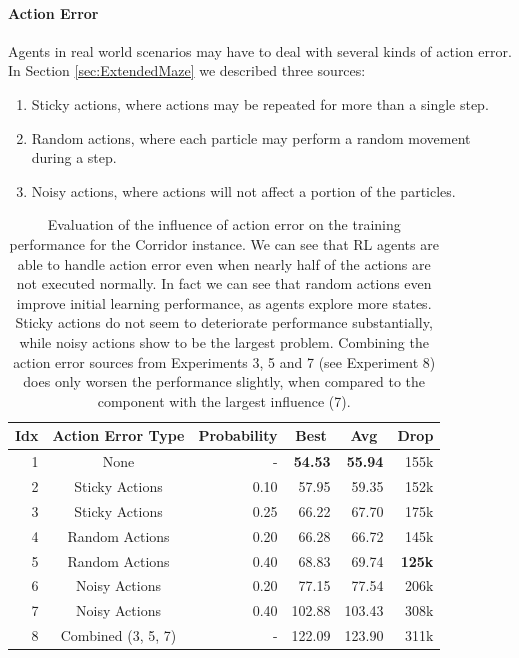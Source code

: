 \paragraph{Action Error}
Agents in real world scenarios may have to deal with several kinds of action error. In Section \ref{sec:ExtendedMaze} we described three sources: 
\begin{enumerate}
    \item Sticky actions, where actions may be repeated for more than a single step.
    \item Random actions, where each particle may perform a random movement during a step.
    \item Noisy actions, where actions will not affect a portion of the particles.
\end{enumerate}

\begin{table}[htp]
    \begin{center}
        \begin{tabular}{rcrrrr}
            \toprule
            \multicolumn{1}{c}{Idx} & \multicolumn{1}{c}{Action Error Type} & \multicolumn{1}{c}{Probability} & \multicolumn{1}{c}{Best} & \multicolumn{1}{c}{Avg} & \multicolumn{1}{c}{Drop}\\
            \midrule
            1 & None & - & \textbf{54.53} & \textbf{55.94} & 155k \\
            \midrule
            2 & Sticky Actions & 0.10 & 57.95 & 59.35 & 152k \\
            3 & Sticky Actions & 0.25 & 66.22 & 67.70 & 175k \\
            4 & Random Actions & 0.20 & 66.28 & 66.72 & 145k \\
            5 & Random Actions & 0.40 & 68.83 & 69.74 & \textbf{125k} \\
            6 & Noisy Actions & 0.20 & 77.15 & 77.54 & 206k \\
            7 & Noisy Actions & 0.40 & 102.88 & 103.43 & 308k \\
            \midrule
            8 & Combined (3, 5, 7) & - & 122.09 & 123.90 & 311k \\
            \bottomrule
        \end{tabular}
    \end{center}
    \caption[Evaluation of the Influence of Action Error]{Evaluation of the influence of action error on the training performance for the Corridor instance. We can see that RL agents are able to handle action error even when nearly half of the actions are not executed normally. In fact we can see that random actions even improve initial learning performance, as agents explore more states. Sticky actions do not seem to deteriorate performance substantially, while noisy actions show to be the largest problem. Combining the action error sources from Experiments 3, 5 and 7 (see Experiment 8) does only worsen the performance slightly, when compared to the component with the largest influence (7).} \label{tab:Eval/Error/Actions}
\end{table}

